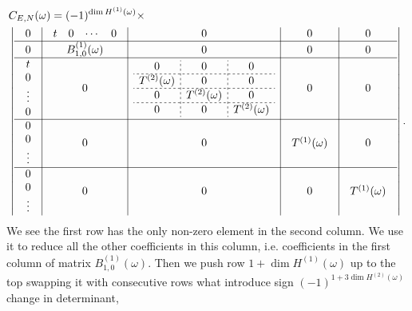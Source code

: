 \documentclass{article}
\begin{document}
\begin{equation}
\begin{split}
    &C_{E,N}(\omega) = (-1)^{\dim H^{(1)}(\omega)} \times\\ 
    &\left\vert
    \begin{array}{c|c|c|c|c}
        0 & 
            \begin{array}{cccc} t & 0 & \cdots & 0 \end{array} & 
            0 & 0 & 0 \\
        \hline
        0 & B^{(1)}_{1,0}(\omega) & 0 & 0 & 0 \\
        \hline
        \begin{array}{c} t \\ 0 \\ \vdots \\ 0 \end{array} & 
            0 & 
            \begin{array}{c;{2pt/2pt}c;{2pt/2pt}c}
                0 & 0 & 0 \\
                \hdashline[2pt/2pt]
                T^{(2)}(\omega) & 0 & 0 \\
                \hdashline[2pt/2pt]
                0 & T^{(2)}(\omega) & 0  \\
                \hdashline[2pt/2pt]
                0 & 0 & T^{(2)}(\omega)
            \end{array}            
            & 0 & 0 \\
        \hline
        \begin{array}{c} 0 \\ 0 \\ \vdots \end{array} & 
            0 & 0 &\begin{array}{c} T^{(1)}(\omega) \end{array} & 0 \\
        \hline
        \begin{array}{c} 0 \\ 0 \\ \vdots \end{array} & 
            0 & 0 & 0 & \begin{array}{c} T^{(1)}(\omega) \end{array}
    \end{array}
    \right\vert.
\end{split}
\end{equation}
We see the first row has the only non-zero element in the second column. We use it to reduce all the other coefficients in this column, i.e. coefficients in the first column of matrix $B^{(1)}_{1,0}(\omega)$. Then we push row $1 + \dim H^{(1)}(\omega)$ up to the top swapping it with consecutive rows what introduce sign $(-1)^{1 + 3\dim H^{(2)}(\omega)}$ change in determinant,
\end{document}
